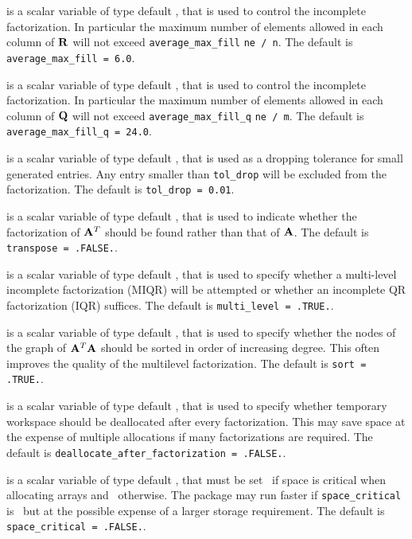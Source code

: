 \documentclass{galahad}
\begin{document}
\begin{description}
 is a scalar variable of type default \realdp, that
is used to control the incomplete factorization. In particular
 the maximum number of elements allowed in each column of ${\mathbf{R}}$ will not exceed
{\tt average\_max\_fill} {\tt * ne / n}.
The default is {\tt average\_max\_fill = 6.0}.

 is a scalar variable of type default \realdp, that
is used to control the incomplete factorization. In particular
 the maximum number of elements allowed in each column of ${\mathbf{Q}}$ will not exceed
{\tt average\_max\_fill\_q} {\tt * ne / m}.
The default is {\tt average\_max\_fill\_q = 24.0}.

 is a scalar variable of type default \realdp, that is used
as a dropping tolerance for small generated entries. Any entry smaller
than  {\tt tol\_drop} will be excluded from the factorization.
The default is {\tt tol\_drop = 0.01}.

 is a scalar variable of type default \logical, that is used
to indicate whether the factorization of ${\mathbf{A}}^T$ should be found rather
than that of ${\mathbf{A}}$.
The default is {\tt transpose = .FALSE.}.

 is a scalar variable of type default \logical, that is used
to specify whether a multi-level incomplete factorization (MIQR) will be
attempted or whether an incomplete QR factorization (IQR) suffices.
The default is {\tt multi\_level = .TRUE.}.

 is a scalar variable of type default \logical, that is used
to specify whether the nodes of the graph of ${\mathbf{A}}^T {\mathbf{A}}$ should be sorted
in order of increasing degree. This often improves the quality of the
multilevel factorization.
The default is {\tt sort = .TRUE.}.

 is a scalar variable of type default
\logical, that is used to specify whether temporary workspace
should be deallocated after every factorization. This may save space
at the expense of multiple allocations if many factorizations are required.
The default is {\tt deallocate\_after\_factorization = .FALSE.}.

 is a scalar variable of type default \logical,
that must be set \true\ if space is critical when allocating arrays
and  \false\ otherwise. The package may run faster if
{\tt space\_critical} is \false\ but at the possible expense of a larger
storage requirement. The default is {\tt space\_critical = .FALSE.}.


\end{description}
\end{document}
